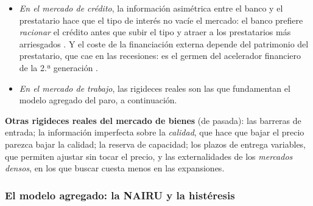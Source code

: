 \documentclass[11pt]{article}
\begin{document}
\begin{itemize}
\begin{itemize}
  \end{itemize}
\item \emph{En el mercado de crédito}, la información asimétrica entre el banco y el prestatario hace que el tipo de interés no vacíe el mercado: el banco prefiere \emph{racionar} el crédito antes que subir el tipo y atraer a los prestatarios más arriesgados\nocite{StiglitzWeiss1981Credit} . Y el coste de la financiación externa depende del patrimonio del prestatario, que cae en las recesiones\nocite{BernankeGertler1989Agency}: es el germen del acelerador financiero de la 2.ª generación .
\item \emph{En el mercado de trabajo}, las rigideces reales son las que fundamentan el modelo agregado del paro, a continuación.
\end{itemize}

\begin{anotaciones}
\textbf{Otras rigideces reales del mercado de bienes} (de pasada): las barreras de entrada; la información imperfecta sobre la \emph{calidad}, que hace que bajar el precio parezca bajar la calidad\nocite{Stiglitz1987Quality}; la reserva de capacidad; los plazos de entrega variables, que permiten ajustar sin tocar el precio, y las externalidades de los \emph{mercados densos}, en los que buscar cuesta menos en las expansiones\nocite{Diamond1982Aggregate}.
\end{anotaciones}

\subsubsection{El modelo agregado: la NAIRU y la histéresis}\label{sec:nairu-histeresis}
\end{document}
